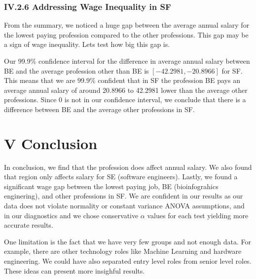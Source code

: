\documentclass[
]{article}
\begin{document}
\subsubsection{IV.2.6 Addressing Wage Inequality in
SF}\label{iv.2.6-addressing-wage-inequality-in-sf}

From the summary, we noticed a huge gap between the average annual
salary for the lowest paying profession compared to the other
professions. This gap may be a sign of wage inequality. Lets test how
big this gap is.

Our 99.9\% confidence interval for the difference in average annual
salary between BE and the average profession other than BE is
\([-42.2981, -20.8966]\) for SF. This means that we are 99.9\% confident
that in SF the profession BE pays an average annual salary of around
20.8966 to 42.2981 lower than the average other professions. Since 0 is
not in our confidence interval, we conclude that there is a difference
between BE and the average other professions in SF.

\section{V Conclusion}\label{v-conclusion}

In conclusion, we find that the profession does affect annual salary. We
also found that region only affects salary for SE (software engineers).
Lastly, we found a significant wage gap between the lowest paying job,
BE (bioinfograhics enginering), and other professions in SF. We are
confident in our results as our data does not violate normality or
constant variance ANOVA assumptions, and in our diagnostics and we chose
conservative \(\alpha\) values for each test yielding more accurate
results.

One limitation is the fact that we have very few groups and not enough
data. For example, there are other technology roles like Machine
Learning and hardware engineering. We could have also separated entry
level roles from senior level roles. These ideas can present more
insighful results.
\end{document}
